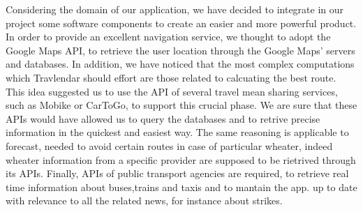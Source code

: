 
	Considering the domain of our application, we have decided to integrate in our project some software components to create an easier and more powerful product. 
	In order to provide an excellent navigation service, we thought to adopt the Google Maps API, to retrieve the user location through the Google Maps' servers and databases. 
	In addition, we have noticed that the most complex computations which Travlendar should effort are those related to calcuating the best route. This idea suggested us to use the API of several travel mean sharing services, such as Mobike or CarToGo, 
	to support this crucial phase. We are sure that these APIs would have allowed us to query the databases and to retrive precise information in the quickest and easiest way.
	The same reasoning is applicable to forecast, needed to avoid certain routes in case of particular wheater, indeed wheater information from a specific provider are supposed to be rietrived through its APIs. 
	Finally, APIs of public transport agencies are required, to retrieve real time information about buses,trains and taxis and to mantain the app. up to date with relevance to all the related news, for instance about strikes. 
	
	
